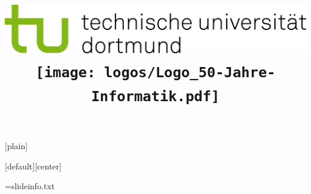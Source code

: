 \ifshownotes
	[plain]%
	\usepackage{pgfpages}
	\let\notebak\note
	\renewcommand{\note}[1]{\notebak{
	\begin{frame}\begin{quote}\sf\scriptsize #1 \addtocounter{framenumber}{-1}\end{quote}\end{frame}
	}}
\fi


\title{\vspace{-2cm}\newline\includegraphics[height=0.08\textheight]{logos/TU_Dortmund.jpg}\hspace{0.33\textwidth}\texttt{[image: logos/Logo\_50-Jahre-Informatik.pdf]}\vspace{0.5cm}\newline\thetitle}
\author{\theauthor}
\date{\small\thedate}
\institute{\theinstitute}
\subtitle{\vspace{0.25cm}\thesubtitle\vspace{-0.25cm}}

[default][center]

\usepackage{multicol}

\usepackage[absolute,overlay]{textpos}
\newcommand{\drawat}[2]{ %
	\begin{textblock*}{0mm}(#1)
		#2
	\end{textblock*}
}
\usepackage[texcoord,
gridunit=mm,gridcolor=black!10,subgridcolor=black!5,gridBG=false]{eso-pic}

\newwrite\slideinfofile
\immediate\openout\slideinfofile=slideinfo.txt

